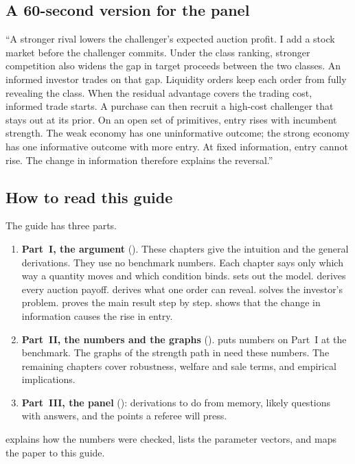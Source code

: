 \subsection{A 60-second version for the panel}\label{sec:01_brief-sixty}

\begin{panelnote}
``A stronger rival lowers the challenger's expected auction profit.
I add a stock market before the challenger commits.
Under the class ranking, stronger competition also widens the gap in target proceeds between the two classes.
An informed investor trades on that gap.
Liquidity orders keep each order from fully revealing the class.
When the residual advantage covers the trading cost, informed trade starts.
A purchase can then recruit a high-cost challenger that stays out at its prior.
On an open set of primitives, entry rises with incumbent strength.
The weak economy has one uninformative outcome; the strong economy has one informative outcome with more entry.
At fixed information, entry cannot rise.
The change in information therefore explains the reversal.''
\end{panelnote}

\subsection{How to read this guide}\label{sec:01_brief-read}

The guide has three parts.
\begin{enumerate}
\item \textbf{Part~I, the argument} ().
These chapters give the intuition and the general derivations. They use no benchmark numbers. Each chapter
says only which way a quantity moves and which condition binds.
 sets out the model.  derives every auction payoff.
 derives what one order can reveal.  solves
the investor's problem.  proves the main result step by step.
 shows that the change in information causes the rise in entry.
\item \textbf{Part~II, the numbers and the graphs} ().
 puts numbers on Part~I at the benchmark. The graphs of the strength path in
 need these numbers. The remaining chapters cover robustness,
welfare and sale terms, and empirical implications.
\item \textbf{Part~III, the panel} (): derivations to do from memory, likely questions
with answers, and the points a referee will press.
\end{enumerate}
 explains how the numbers were checked,  lists the parameter
vectors, and  maps the paper to this guide.

